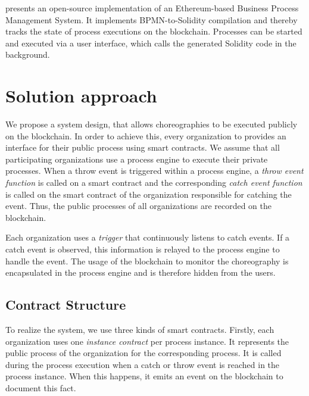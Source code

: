 \documentclass[runningheads]{llncs}
\begin{document}


\cite{lopez2017caterpillar} presents an open-source implementation of an Ethereum-based Business Process Management System.
It implements BPMN-to-Solidity compilation and thereby tracks the state of process executions on the blockchain.
Processes can be started and executed via a user interface, which calls the generated Solidity code in the background.


\section{Solution approach}
We propose a system design, that allows choreographies to be executed publicly on the blockchain.
In order to achieve this, every organization to provides an interface for their public process using smart contracts.
We assume that all participating organizations use a process engine to execute their private processes.
When a throw event is triggered within a process engine, a \emph{throw event function} is called on a smart contract and the corresponding \emph{catch event function} is called on the smart contract of the organization responsible for catching the event.
Thus, the public processes of all organizations are recorded on the blockchain.

Each organization uses a \emph{trigger} that continuously listens to catch events.
If a catch event is observed, this information is relayed to the process engine to handle the event.
The usage of the blockchain to monitor the choreography is encapsulated in the process engine and is therefore hidden from the users.




\subsection{Contract Structure}
To realize the system, we use three kinds of smart contracts.
Firstly, each organization uses one \emph{instance contract} per process instance.
It represents the public process of the organization for the corresponding process.
It is called during the process execution when a catch or throw event is reached in the process instance.
When this happens, it emits an event on the blockchain to document this fact.
\end{document}
